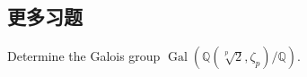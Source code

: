 
\subsection{更多习题}

\setcounter{pb}{26}
\begin{problem}
    Determine the Galois group $ \operatorname{Gal}(\mathbb{Q}(\sqrt[p]{2}, \zeta_p)/\mathbb{Q}) $.
\end{problem}

